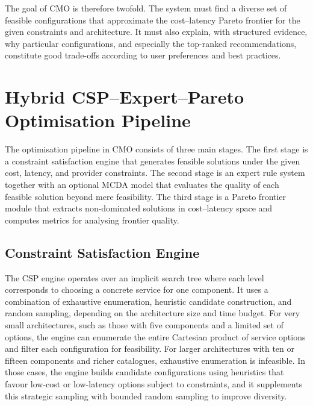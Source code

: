 \documentclass[journal]{IEEEtran}
\newcommand{\cmo}{CMO\xspace}
\begin{document}
The goal of \cmo is therefore twofold. The system must find a diverse set of
feasible configurations that approximate the cost--latency Pareto frontier for
the given constraints and architecture. It must also explain, with structured
evidence, why particular configurations, and especially the top-ranked
recommendations, constitute good trade-offs according to user preferences and
best practices.

\section{Hybrid CSP--Expert--Pareto Optimisation Pipeline}
\label{sec:pipeline}

The optimisation pipeline in \cmo consists of three main stages. The first
stage is a constraint satisfaction engine that generates feasible solutions
under the given cost, latency, and provider constraints. The second stage is an
expert rule system together with an optional MCDA model that evaluates the
quality of each feasible solution beyond mere feasibility. The third stage is a
Pareto frontier module that extracts non-dominated solutions in cost--latency
space and computes metrics for analysing frontier quality.

\subsection{Constraint Satisfaction Engine}
\label{sec:csp}

The CSP engine operates over an implicit search tree where each level
corresponds to choosing a concrete service for one component. It uses a
combination of exhaustive enumeration, heuristic candidate construction, and
random sampling, depending on the architecture size and time budget. For very
small architectures, such as those with five components and a limited set of
options, the engine can enumerate the entire Cartesian product of service
options and filter each configuration for feasibility. For larger architectures
with ten or fifteen components and richer catalogues, exhaustive enumeration is
infeasible. In those cases, the engine builds candidate configurations using
heuristics that favour low-cost or low-latency options subject to constraints,
and it supplements this strategic sampling with bounded random sampling to
improve diversity.
\end{document}
